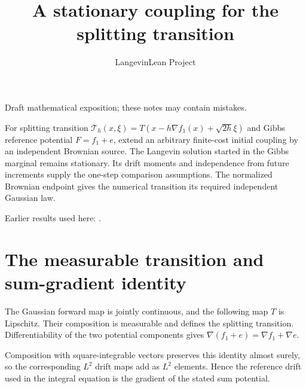 \documentclass[11pt,a4paper]{article}
\title{\texorpdfstring{A stationary coupling for the splitting transition}{A stationary coupling for the splitting transition}}
\author{LangevinLean Project}
\date{}
\begin{document}
\maketitle
Draft mathematical exposition; these notes may contain mistakes.


For splitting transition \(\mathcal T_h(x,\xi)=T(x-h\nabla f_1(x)+\sqrt{2h}\xi)\) and Gibbs reference potential \(F=f_1+e\), extend an arbitrary finite-cost initial coupling by an independent Brownian source. The Langevin solution started in the Gibbs marginal remains stationary. Its drift moments and independence from future increments supply the one-step comparison assumptions. The normalized Brownian endpoint gives the numerical transition its required independent Gaussian law.



Earlier results used here: \cite[Section~3.45]{LangevinLean2026ULASC}.

\section{\texorpdfstring{The measurable transition and sum-gradient identity}{The measurable transition and sum-gradient identity}}


The Gaussian forward map is jointly continuous, and the following map \(T\) is Lipschitz. Their composition is measurable and defines the splitting transition. Differentiability of the two potential components gives \(\nabla(f_1+e)=\nabla f_1+\nabla e\).



Composition with square-integrable vectors preserves this identity almost surely, so the corresponding \(L^2\) drift maps add as \(L^2\) elements. Hence the reference drift used in the integral equation is the gradient of the stated sum potential.
\end{document}

